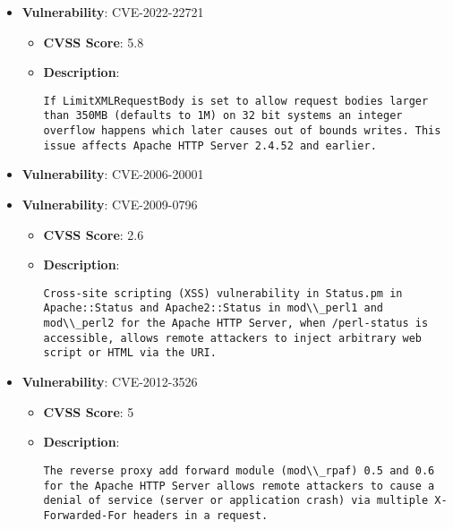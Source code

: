 \documentclass{article}
\begin{document}
\begin{itemize}
\begin{itemize}
{|
            }
        \end{itemize}
    
        \item \textbf{Vulnerability}: CVE-2022-22721
        \begin{itemize}
            \item \textbf{CVSS Score}:  5.8 
            \item \textbf{Description}:
            \parbox[t]{0.9\linewidth}{
                \verb|If LimitXMLRequestBody is set to allow request bodies larger than 350MB (defaults to 1M) on 32 bit systems an integer overflow happens which later causes out of bounds writes. This issue affects Apache HTTP Server 2.4.52 and earlier.|
            }
        \end{itemize}
    
        \item \textbf{Vulnerability}: CVE-2006-20001
    
        \item \textbf{Vulnerability}: CVE-2009-0796
        \begin{itemize}
            \item \textbf{CVSS Score}:  2.6 
            \item \textbf{Description}:
            \parbox[t]{0.9\linewidth}{
                \verb|Cross-site scripting (XSS) vulnerability in Status.pm in Apache::Status and Apache2::Status in mod\\_perl1 and mod\\_perl2 for the Apache HTTP Server, when /perl-status is accessible, allows remote attackers to inject arbitrary web script or HTML via the URI.|
            }
        \end{itemize}
    
        \item \textbf{Vulnerability}: CVE-2012-3526
        \begin{itemize}
            \item \textbf{CVSS Score}:  5 
            \item \textbf{Description}:
            \parbox[t]{0.9\linewidth}{
                \verb|The reverse proxy add forward module (mod\\_rpaf) 0.5 and 0.6 for the Apache HTTP Server allows remote attackers to cause a denial of service (server or application crash) via multiple X-Forwarded-For headers in a request.|
            }
        \end{itemize}
    

\end{itemize}
\end{document}
